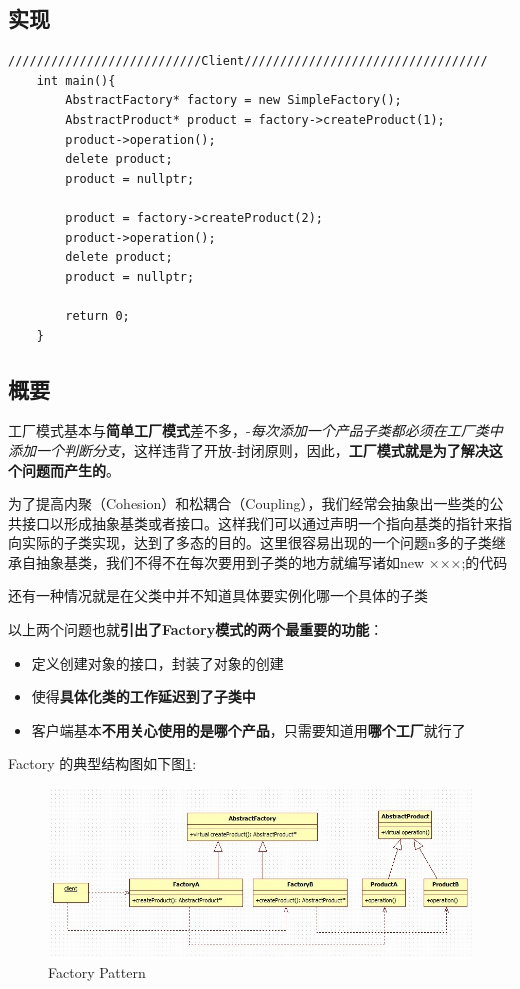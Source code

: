 \documentclass[UTF8,a4paper,12pt]{ctexbook}
\begin{document}
	\subsection{实现}	
\begin{lstlisting}
///////////////////////////Client//////////////////////////////////
	int main(){
		AbstractFactory* factory = new SimpleFactory();
		AbstractProduct* product = factory->createProduct(1);
		product->operation();
		delete product;
		product = nullptr;
	
		product = factory->createProduct(2);
		product->operation();
		delete product;
		product = nullptr;
		
		return 0;
	}
\end{lstlisting}
	\subsection{概要}
		工厂模式基本与\textbf{简单工厂模式}差不多，-\textit{每次添加一个产品子类都必须在工厂类中添加一个判断分支}，这样违背了开放-封闭原则，因此，\textbf{工厂模式就是为了解决这个问题而产生的}。
		
		为了提高内聚（Cohesion）和松耦合（Coupling），我们经常会抽象出一些类的公共接口以形成抽象基类或者接口。这样我们可以通过声明一个指向基类的指针来指向实际的子类实现，达到了多态的目的。这里很容易出现的一个问题n多的子类继承自抽象基类，我们不得不在每次要用到子类的地方就编写诸如new ×××;的代码

		还有一种情况就是在父类中并不知道具体要实例化哪一个具体的子类
		
		以上两个问题也就\textbf{引出了Factory模式的两个最重要的功能}：
			\begin{itemize}[itemindent = 1em]
				\item 定义创建对象的接口，封装了对象的创建
				
				\item 使得\textbf{具体化类的工作延迟到了子类中}
				
				\item 客户端基本\textbf{不用关心使用的是哪个产品}，只需要知道用\textbf{哪个工厂}就行了
			\end{itemize}
			
		Factory 的典型结构图如下图\ref{Factory}:
		\begin{figure}[h]
			\centering
			\includegraphics[width = 14cm]{Factory.jpg}
			\caption{Factory Pattern}
			\label{Factory}
		\end{figure}
\end{document}
